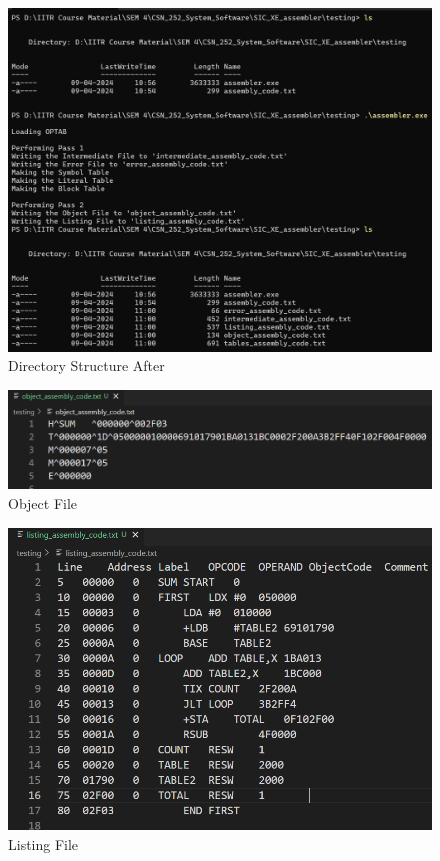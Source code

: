 \documentclass[
]{article}
\begin{document}
\begin{figure}[H]
\centering
\includegraphics{img/image-10.png}
\caption{Directory Structure After}
\end{figure}

\begin{figure}[H]
\centering
\includegraphics{img/image-4.png}
\caption{Object File}
\end{figure}

\begin{figure}[H]
\centering
\includegraphics{img/image-3.png}
\caption{Listing File}
\end{figure}
\end{document}
